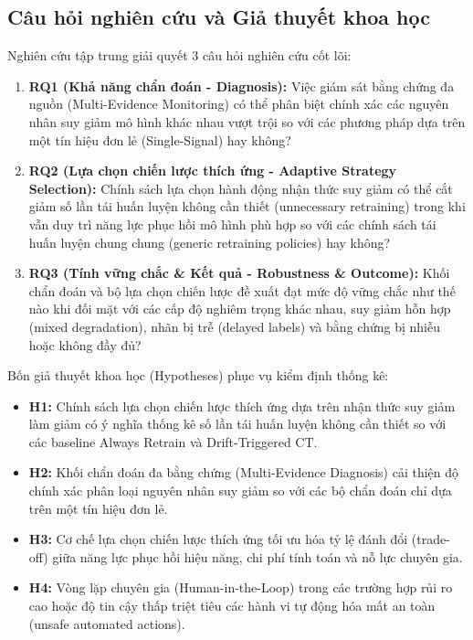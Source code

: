 \subsection{Câu hỏi nghiên cứu và Giả thuyết khoa học}

Nghiên cứu tập trung giải quyết 3 câu hỏi nghiên cứu cốt lõi:
\begin{enumerate}
  \item \textbf{RQ1 (Khả năng chẩn đoán - Diagnosis):} Việc giám sát bằng chứng đa nguồn (Multi-Evidence Monitoring) có thể phân biệt chính xác các nguyên nhân suy giảm mô hình khác nhau vượt trội so với các phương pháp dựa trên một tín hiệu đơn lẻ (Single-Signal) hay không?
  \item \textbf{RQ2 (Lựa chọn chiến lược thích ứng - Adaptive Strategy Selection):} Chính sách lựa chọn hành động nhận thức suy giảm có thể cắt giảm số lần tái huấn luyện không cần thiết (unnecessary retraining) trong khi vẫn duy trì năng lực phục hồi mô hình phù hợp so với các chính sách tái huấn luyện chung chung (generic retraining policies) hay không?
  \item \textbf{RQ3 (Tính vững chắc \& Kết quả - Robustness \& Outcome):} Khối chẩn đoán và bộ lựa chọn chiến lược đề xuất đạt mức độ vững chắc như thế nào khi đối mặt với các cấp độ nghiêm trọng khác nhau, suy giảm hỗn hợp (mixed degradation), nhãn bị trễ (delayed labels) và bằng chứng bị nhiễu hoặc không đầy đủ?
\end{enumerate}

Bốn giả thuyết khoa học (Hypotheses) phục vụ kiểm định thống kê:
\begin{itemize}
  \item \textbf{H1:} Chính sách lựa chọn chiến lược thích ứng dựa trên nhận thức suy giảm làm giảm có ý nghĩa thống kê số lần tái huấn luyện không cần thiết so với các baseline Always Retrain và Drift-Triggered CT.
  \item \textbf{H2:} Khối chẩn đoán đa bằng chứng (Multi-Evidence Diagnosis) cải thiện độ chính xác phân loại nguyên nhân suy giảm so với các bộ chẩn đoán chỉ dựa trên một tín hiệu đơn lẻ.
  \item \textbf{H3:} Cơ chế lựa chọn chiến lược thích ứng tối ưu hóa tỷ lệ đánh đổi (trade-off) giữa năng lực phục hồi hiệu năng, chi phí tính toán và nỗ lực chuyên gia.
  \item \textbf{H4:} Vòng lặp chuyên gia (Human-in-the-Loop) trong các trường hợp rủi ro cao hoặc độ tin cậy thấp triệt tiêu các hành vi tự động hóa mất an toàn (unsafe automated actions).
\end{itemize}

